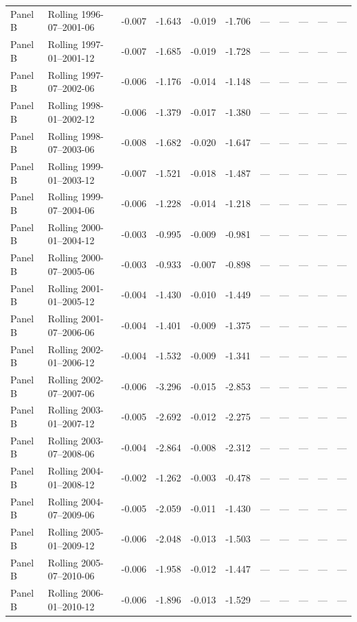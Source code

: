 \begin{longtable}{lllrrrrrrrl}
Panel B & Rolling 1996-07–2001-06 & -0.007 & -1.643 & -0.019 & -1.706 & — & — & — & — & — \\
Panel B & Rolling 1997-01–2001-12 & -0.007 & -1.685 & -0.019 & -1.728 & — & — & — & — & — \\
Panel B & Rolling 1997-07–2002-06 & -0.006 & -1.176 & -0.014 & -1.148 & — & — & — & — & — \\
Panel B & Rolling 1998-01–2002-12 & -0.006 & -1.379 & -0.017 & -1.380 & — & — & — & — & — \\
Panel B & Rolling 1998-07–2003-06 & -0.008 & -1.682 & -0.020 & -1.647 & — & — & — & — & — \\
Panel B & Rolling 1999-01–2003-12 & -0.007 & -1.521 & -0.018 & -1.487 & — & — & — & — & — \\
Panel B & Rolling 1999-07–2004-06 & -0.006 & -1.228 & -0.014 & -1.218 & — & — & — & — & — \\
Panel B & Rolling 2000-01–2004-12 & -0.003 & -0.995 & -0.009 & -0.981 & — & — & — & — & — \\
Panel B & Rolling 2000-07–2005-06 & -0.003 & -0.933 & -0.007 & -0.898 & — & — & — & — & — \\
Panel B & Rolling 2001-01–2005-12 & -0.004 & -1.430 & -0.010 & -1.449 & — & — & — & — & — \\
Panel B & Rolling 2001-07–2006-06 & -0.004 & -1.401 & -0.009 & -1.375 & — & — & — & — & — \\
Panel B & Rolling 2002-01–2006-12 & -0.004 & -1.532 & -0.009 & -1.341 & — & — & — & — & — \\
Panel B & Rolling 2002-07–2007-06 & -0.006 & -3.296 & -0.015 & -2.853 & — & — & — & — & — \\
Panel B & Rolling 2003-01–2007-12 & -0.005 & -2.692 & -0.012 & -2.275 & — & — & — & — & — \\
Panel B & Rolling 2003-07–2008-06 & -0.004 & -2.864 & -0.008 & -2.312 & — & — & — & — & — \\
Panel B & Rolling 2004-01–2008-12 & -0.002 & -1.262 & -0.003 & -0.478 & — & — & — & — & — \\
Panel B & Rolling 2004-07–2009-06 & -0.005 & -2.059 & -0.011 & -1.430 & — & — & — & — & — \\
Panel B & Rolling 2005-01–2009-12 & -0.006 & -2.048 & -0.013 & -1.503 & — & — & — & — & — \\
Panel B & Rolling 2005-07–2010-06 & -0.006 & -1.958 & -0.012 & -1.447 & — & — & — & — & — \\
Panel B & Rolling 2006-01–2010-12 & -0.006 & -1.896 & -0.013 & -1.529 & — & — & — & — & — \\

\end{longtable}
